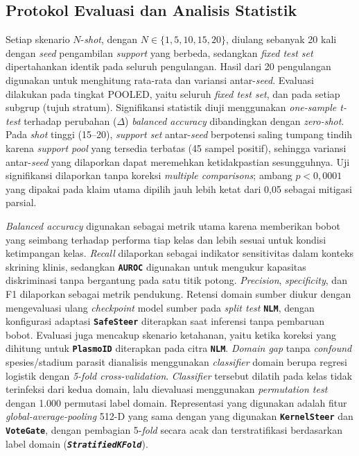 \documentclass[conference]{IEEEtran}
\newcommand{\nama}[1]{\textbf{\texttt{#1}}}
\begin{document}
\subsection{Protokol Evaluasi dan Analisis Statistik}
Setiap skenario $N$-\textit{shot}, dengan $N\in\{1,5,10,15,20\}$, diulang sebanyak 20 kali dengan \textit{seed} pengambilan \textit{support} yang berbeda, sedangkan \textit{fixed test set} dipertahankan identik pada seluruh pengulangan. Hasil dari 20 pengulangan digunakan untuk menghitung rata-rata dan variansi antar-\textit{seed}. Evaluasi dilakukan pada tingkat POOLED, yaitu seluruh \textit{fixed test set}, dan pada setiap subgrup (tujuh stratum). Signifikansi statistik diuji menggunakan \textit{one-sample t-test} terhadap perubahan ($\Delta$) \textit{balanced accuracy} dibandingkan dengan \textit{zero-shot}. Pada \textit{shot} tinggi (15--20), \textit{support set} antar-\textit{seed} berpotensi saling tumpang tindih karena \textit{support pool} yang tersedia terbatas (45 sampel positif), sehingga variansi antar-\textit{seed} yang dilaporkan dapat meremehkan ketidakpastian sesungguhnya. Uji signifikansi dilaporkan tanpa koreksi \textit{multiple comparisons}; ambang $p<0{,}0001$ yang dipakai pada klaim utama dipilih jauh lebih ketat dari 0,05 sebagai mitigasi parsial.

\textit{Balanced accuracy} digunakan sebagai metrik utama karena memberikan bobot yang seimbang terhadap performa tiap kelas dan lebih sesuai untuk kondisi ketimpangan kelas. \textit{Recall} dilaporkan sebagai indikator sensitivitas dalam konteks skrining klinis, sedangkan \nama{AUROC} digunakan untuk mengukur kapasitas diskriminasi tanpa bergantung pada satu titik potong. \textit{Precision}, \textit{specificity}, dan F1 dilaporkan sebagai metrik pendukung.
Retensi domain sumber diukur dengan mengevaluasi ulang \textit{checkpoint} model sumber pada \textit{split test} \nama{NLM}, dengan konfigurasi adaptasi \nama{SafeSteer} diterapkan saat inferensi tanpa pembaruan bobot. Evaluasi juga mencakup skenario ketahanan, yaitu ketika koreksi yang dihitung untuk \nama{PlasmoID} diterapkan pada citra \nama{NLM}. \textit{Domain gap} tanpa \textit{confound} spesies/stadium parasit dianalisis menggunakan \textit{classifier} domain berupa regresi logistik dengan \textit{5-fold cross-validation}. \textit{Classifier} tersebut dilatih pada kelas tidak terinfeksi dari kedua domain,
lalu dievaluasi menggunakan \textit{permutation test} dengan 1.000 permutasi label domain. Representasi yang digunakan adalah fitur \textit{global-average-pooling} 512-D yang sama dengan yang digunakan \nama{KernelSteer} dan \nama{VoteGate}, dengan pembagian 5-\textit{fold} secara acak dan terstratifikasi berdasarkan label domain (\textit{\nama{StratifiedKFold}}).
\end{document}
